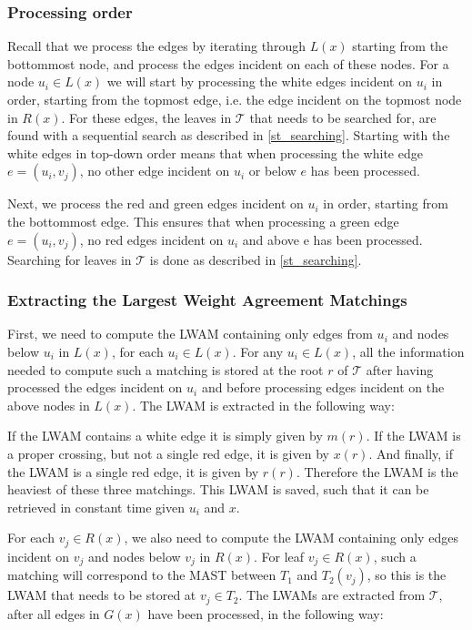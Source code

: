 \subsubsection{Processing order}
Recall that we process the edges by iterating through $L(x)$ starting from the bottommost node, and process the edges incident on each of these nodes. For a node $u_i \in L(x)$ we will start by processing the white edges incident on $u_i$ in order, starting from the topmost edge, i.e. the edge incident on the topmost node in $R(x)$. For these edges, the leaves in $\mathcal{T}$ that needs to be searched for, are found with a sequential search as described in \ref{st_searching}. Starting with the white edges in top-down order means that when processing the white edge $e=(u_i,v_j)$, no other edge incident on $u_i$ or below $e$ has been processed.

Next, we process the red and green edges incident on $u_i$ in order, starting from the bottommost edge. This ensures that when processing a green edge $e=(u_i,v_j)$, no red edges incident on $u_i$ and above e has been processed. Searching for leaves in $\mathcal{T}$ is done as described in \ref{st_searching}.

\subsubsection{Extracting the Largest Weight Agreement Matchings}
First, we need to compute the LWAM containing only edges from $u_i$ and nodes below $u_i$ in $L(x)$, for each $u_i \in L(x)$. For any $u_i \in L(x)$, all the information needed to compute such a matching is stored at the root $r$ of $\mathcal{T}$ after having processed the edges incident on $u_i$ and before processing edges incident on the above nodes in $L(x)$. The LWAM is extracted in the following way:

If the LWAM contains a white edge it is simply given by $m(r)$. If the LWAM is a proper crossing, but not a single red edge, it is given by $x(r)$. And finally, if the LWAM is a single red edge, it is given by $r(r)$. Therefore the LWAM is the heaviest of these three matchings. This LWAM is saved, such that it can be retrieved in constant time given $u_i$ and $x$. 

For each $v_j \in R(x)$, we also need to compute the LWAM containing only edges incident on $v_j$ and nodes below $v_j$ in $R(x)$. For leaf $v_j \in R(x)$, such a matching will correspond to the MAST between $T_1$ and $T_2(v_j)$, so this is the LWAM that needs to be stored at $v_j \in T_2$. The LWAMs are extracted from $\mathcal{T}$, after all edges in $G(x)$ have been processed, in the following way:

